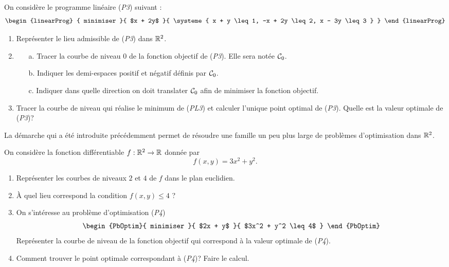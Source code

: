 \documentclass[11pt, a4paper]{article}
\begin{document}
\begin{question}
  On considère le programme linéaire (\emph{P3}) suivant :
  \[
    \begin{linearProg} {
        minimiser
      }{
        $x + 2y$
      }{
        \systeme{
          x + y \leq 1,
          -x + 2y \leq 2,
          x - 3y \leq 3
        }
      }
    \end{linearProg}
  \]
  \begin{enumerate}
  \item Représenter le lieu admissible de (\emph{P3}) dans $\mathbb{R}^2$.
  \item
    \begin{enumerate}
    \item[a.]  Tracer la courbe de niveau $0$ de la fonction objectif
      de (\emph{P3}). Elle sera notée $\mathcal{C}_0$.
    \item[b.]  Indiquer les demi-espaces positif et négatif définis
      par $\mathcal{C}_0$.
    \item[c.]  Indiquer dans quelle direction on doit translater
      $\mathcal{C}_0$ afin de minimiser la fonction objectif.
    \end{enumerate}
  \item Tracer la courbe de niveau qui réalise le minimum de
    (\emph{PL3}) et calculer l'unique point optimal de
    (\emph{P3}). Quelle est la valeur optimale de (\emph{P3})?
  \end{enumerate}
\end{question}

La démarche qui a été introduite précédemment permet de résoudre une
famille un peu plus large de problèmes d'optimisation dans $\mathbb{R}^2$.

\begin{question}
On considère la fonction différentiable $f : \mathbb{R}^2 \to \mathbb{R}$ donnée par
\[
f(x, y) = 3x^2 + y^2.
\]
\begin{enumerate}
\item Représenter les courbes de niveaux $2$ et $4$ de $f$ dans le
  plan euclidien.
\item À quel lieu correspond la condition $f(x, y) \leq 4$ ?
\item On s'intéresse au problème d'optimisation (\emph{P4})
  \[
  \begin{PbOptim}{
      minimiser
    }{
      $2x + y$
    }{
      $3x^2 + y^2 \leq 4$
    }
  \end{PbOptim}
  \]
  Représenter la courbe de niveau de la fonction objectif qui
  correspond à la valeur optimale de (\emph{P4}).
\item Comment trouver le point optimale correspondant à (\emph{P4})?
  Faire le calcul.
\end{enumerate}
\end{question}
\end{document}
